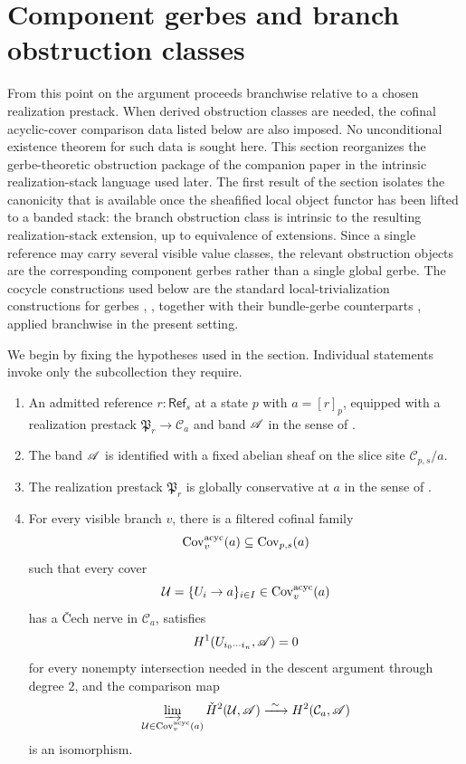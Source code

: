 \section{Component gerbes and branch obstruction classes}\label{sec:gerbe-obstruction}

From this point on the argument proceeds branchwise relative to a chosen realization prestack. When derived obstruction classes are needed, the cofinal acyclic-cover comparison data listed below are also imposed. No unconditional existence theorem for such data is sought here. This section reorganizes the gerbe-theoretic obstruction package of the companion paper \cite{MaZhang2026ConditionalGluingFailure} in the intrinsic realization-stack language used later. The first result of the section isolates the canonicity that is available once the sheafified local object functor has been lifted to a banded stack: the branch obstruction class is intrinsic to the resulting realization-stack extension, up to equivalence of extensions. Since a single reference may carry several visible value classes, the relevant obstruction objects are the corresponding component gerbes rather than a single global gerbe. The cocycle constructions used below are the standard local-trivialization constructions for gerbes \cite[Chap.~IV]{Giraud1971}, \cite[Sec.~5]{Breen2006}, together with their bundle-gerbe counterparts \cite{Murray1996,Brylinski1993}, applied branchwise in the present setting.

We begin by fixing the hypotheses used in the section. Individual statements invoke only the subcollection they require.

\begin{enumerate}[label=\textup{(H\arabic*)},nosep]
\item\label{hyp:admitted-prestack} An admitted reference $r:\mathsf{Ref}_s$ at a state $p$ with $a=[r]_p$, equipped with a realization prestack $\mathfrak P_r \to \mathcal C_a$ and band $\mathscr{A}$ in the sense of .
\item\label{hyp:band-identification} The band $\mathscr{A}$ is identified with a fixed abelian sheaf on the slice site $\mathcal C_{p,s}/a$.
\item\label{hyp:global-conservativity} The realization prestack $\mathfrak P_r$ is globally conservative at $a$ in the sense of .
\item\label{hyp:cofinal-gerbe-adapted} For every visible branch $v$, there is a filtered cofinal family
\[
\mathrm{Cov}_v^{\mathrm{acyc}}(a)\subseteq \mathrm{Cov}_{p,s}(a)
\]
such that every cover
\[
\mathcal U=\{U_i\to a\}_{i\in I}\in \mathrm{Cov}_v^{\mathrm{acyc}}(a)
\]
has a \v{C}ech nerve in $\mathcal C_a$, satisfies
\[
H^1(U_{i_0\cdots i_n},\mathscr{A})=0
\]
for every nonempty intersection needed in the descent argument through degree $2$, and the comparison map
\[
\varinjlim_{\mathcal U\in \mathrm{Cov}_v^{\mathrm{acyc}}(a)} \check H^2(\mathcal U,\mathscr{A})\xrightarrow{\ \sim\ } H^2(\mathcal C_a,\mathscr{A})
\]
is an isomorphism.
\end{enumerate}

